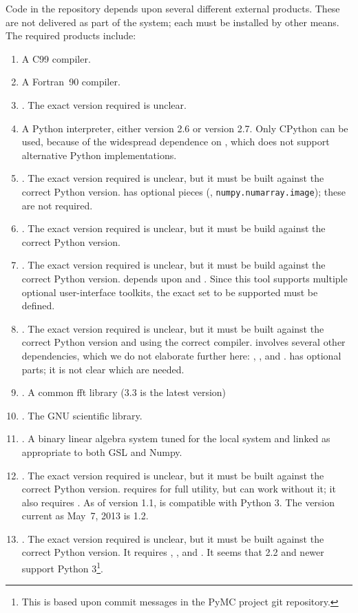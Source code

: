 \documentclass[draftmode,draftwater]{memarticle}
\newcommand{\despipe}{\name{des-pipe}\xspace}
\begin{document}
Code in the \despipe repository depends upon several different
external products. These are not delivered as part of the
\despipe system; each must be installed by other means. The
required products include:
\begin{enumerate}
\item A C99 compiler.
\item A Fortran~90 compiler.
\item {}. The exact version required is unclear.
\item A Python interpreter, either version 2.6 or version 2.7. Only
  CPython can be used, because of the widespread dependence on
  , which does not support alternative Python
  implementations.
\item {}. The exact version required is unclear, but it must
  be built against the correct Python version.  has optional
  pieces (\eg, \texttt{numpy.numarray.image}); these are not required.
\item {}. The exact version required is unclear, but it must
  be build against the correct Python version.
\item {}. The exact version required is unclear, but it
  must be build against the correct Python version. 
  depends upon  and . Since this tool
  supports multiple optional user-interface toolkits, the exact set to
  be supported must be defined.
\item {}. The exact version required is unclear, but it must
  be built against the correct Python version and using the correct
  \cpp{} compiler.  involves several other dependencies,
  which we do not elaborate further here: ,
  , and .  has optional parts; it is
  not clear which are needed.
\item {}. A common fft library (3.3 is the latest version)
\item {}.  The GNU scientific library.
\item {}. A binary linear algebra system tuned for the local
  system and linked as appropriate to both GSL and Numpy.
\item {}. The exact version required is unclear, but it must
  be built against the correct Python version.  requires
   for full utility, but can work without it; it also
  requires . As of version 1.1,  is compatible
  with Python 3. The version current as May~7, 2013 is 1.2.
\item {}. The exact version required is unclear, but it must be
  built against the correct Python version. It requires ,
  , and . It seems that  2.2 and
  newer support Python 3\footnote{This is based upon commit messages in
    the PyMC project git repository.}.
\end{enumerate}
\end{document}
